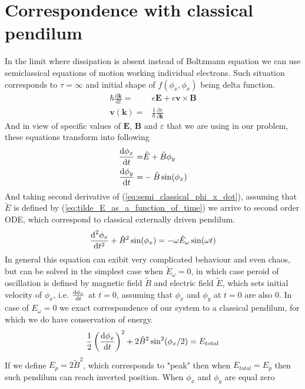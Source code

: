 \documentclass[40pt,letterpaper,physrev]{article}
\begin{document}
    \section{Correspondence with classical pendilum}
    In the limit where dissipation is absent instead of Boltzmann
    equation we can use semiclassical equations of motion working 
    individual electrons. Such situation corresponds to $\tau=\infty$ and initial shape of $f(\phi_x,\phi_x)$ being delta function. 
    \begin{align}
    	\hbar\frac{\text{d}\mathbf{k}}{\text{d}t}=&e\mathbf{E}+e\mathbf{v}\times\mathbf{B} \\
    	\mathbf{v}(\mathbf{k})=&\frac{1}{\hbar}\frac{\partial\varepsilon}{\partial\mathbf{k}}
    \end{align}
    And in view of specific values of $\mathbf{E}$, $\mathbf{B}$ and $\varepsilon$ that we are using in our problem, these equations transform into following
    \begin{align}
	    \frac{\text{d}\phi_x}{\text{d}t}=&\tilde{E}+\tilde{B}\phi_y \label{eq:semi_classical_phi_x_dot} \\
	    \frac{\text{d}\phi_y}{\text{d}t}=&-\tilde{B}\sin(\phi_x) \label{eq:semi_classical_phi_y_dot}
    \end{align}
    And taking second derivative of (\ref{eq:semi_classical_phi_x_dot}), assuming that $\tilde{E}$ is defined by (\ref{eq:tilde_E_as_a_function_of_time}) we arrive to second order ODE, which correspond to classical externally driven pendilum.
    \begin{equation}
    	\frac{\text{d}^{2}\phi_x}{\text{d}t^{2}}+\tilde{B}^2\sin(\phi_x)=-\omega\tilde{E}_\omega\sin(\omega t)
    \end{equation}
    In general this equation can exibit very complicated behaviour and even chaos, but can be solved in the simplest case when $\tilde{E}_\omega=0$, in which case peroid of oscillation is defined by magnetic field $\tilde{B}$ and electric field $\tilde{E}$, which sets initial velocity of $\phi_x$, i.e. $\frac{\text{d}\phi_x}{\text{d}t}$ at $t=0$, assuming that $\phi_x$ and $\phi_y$ at $t=0$ are also $0$. In case of $E_\omega=0$ we exact correspondence of our system to a classical pendilum, for which 
    we do have conservation of energy.
    \begin{equation}
    \frac{1}{2}\left ( \frac{\text{d}\phi_x}{\text{d}t} \right  )^2+2\tilde{B}^2\sin^2(\phi_x/2)=E_{total}
    \end{equation}
    If we define $E_p=2\tilde{B}^2$, which corresponds to 
    "peak" then when $E_{total}=E_p$ then such pendilum can reach 
    inverted position. When $\phi_x$ and $\phi_y$ are equal zero 
\end{document}
